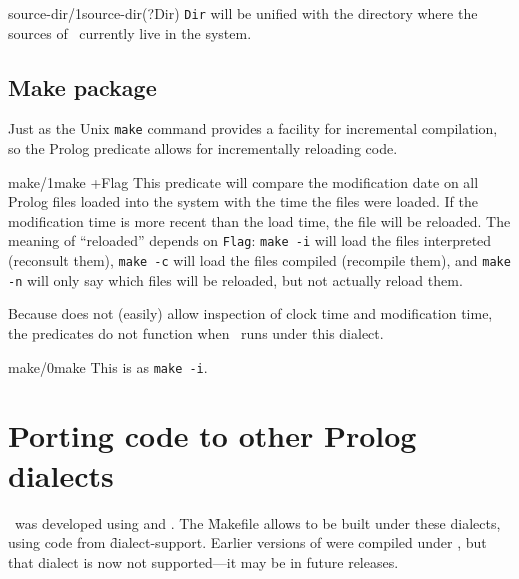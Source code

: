 \begin{predicate}{source-dir/1}{source-dir(?Dir)}%
{\tt Dir} will be unified with the directory where the sources of
\clam\ currently live in the system.
\end{predicate}

\subsection {Make package}
\label{make-pred}

Just as the Unix {\tt make} command provides a facility for
incremental compilation, so the Prolog  predicate allows
for incrementally reloading code.

\begin{predicate}{make/1}{make +Flag}%
This predicate will compare the modification date on all Prolog files
loaded into the system with the time the files were loaded. If the
modification time is more recent than the load time, the file will be
reloaded. The meaning of ``reloaded'' depends on {\tt Flag}: {\tt make -i}
will load the files interpreted (reconsult them), {\tt make -c} will
load the files compiled (recompile them), and {\tt make -n} will only
say which files will be reloaded, but not actually reload them.

\iffalse
This make command has been modelled on the built-in \p{make/0} command
from \inx{SWI Prolog}.
\fi

Because  does not (easily) allow
inspection of clock time and modification time, the 
predicates do not function when \clam\ runs under this dialect.

\iffalse
In \inx{SWI Prolog}, the built-in definition of \p{make/0} applies
instead.
\fi

\end{predicate}

\begin{predicate}{make/0}{make}%
This is as {\tt make -i}.
\end{predicate}

\section {Porting code to other Prolog dialects}

\clam\ was developed using  and . The \f{Makefile} allows \clam to be built under these
dialects, using code from \f{dialect-support}.  Earlier versions of
\clam were compiled under , but that dialect is now
not supported---it may be in future releases.


